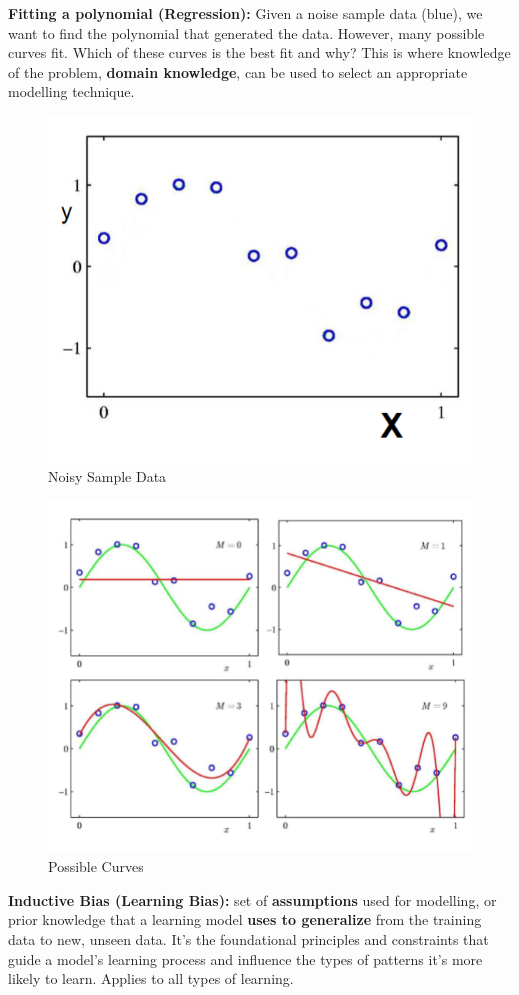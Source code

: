 \begin{enumerate}
\begin{example}
    \textbf{Fitting a polynomial (Regression):} Given a noise sample data (blue), we want to find the polynomial that generated the data.
However, many possible curves fit. Which of these curves is the best fit and why? This is where knowledge of the problem, \textbf{domain knowledge}, can be used to select an appropriate modelling technique.
\end{example}
\begin{figure}[h!t]
    \centering
    \includegraphics[width=0.5\linewidth]{regressionexample1.png}
    \caption{Noisy Sample Data}
    \label{fig:enter-label}
\end{figure}
\begin{figure}[h!t]
    \centering
    \includegraphics[width=0.5\linewidth]{possiblecurves.png}
    \caption{Possible Curves}
    \label{fig:enter-label}
\end{figure}

\begin{definition}
    \textbf{Inductive Bias (Learning Bias):} set of \textbf{assumptions} used for modelling, or prior knowledge that a learning model \textbf{uses to generalize} from the training data to new, unseen data. It's the foundational principles and constraints that guide a model's learning process and influence the types of patterns it's more likely to learn. Applies to all types of learning.
\end{definition}


\end{enumerate}
